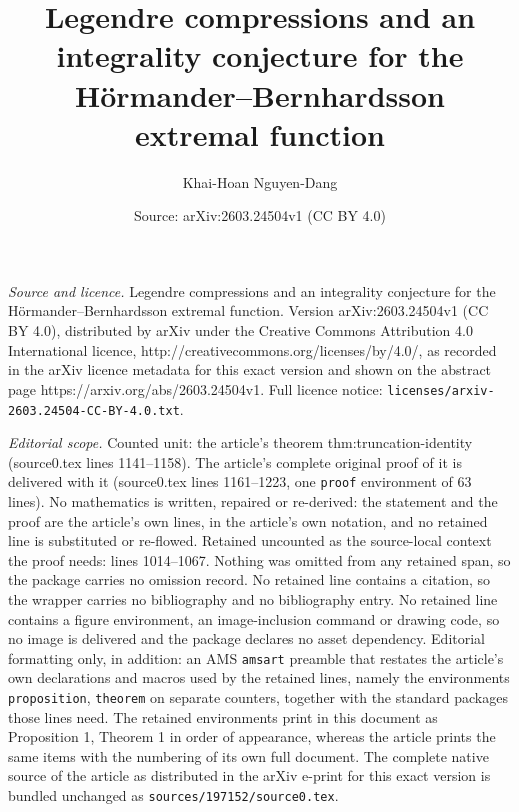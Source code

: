 \documentclass[10pt,a4paper]{amsart}
\title{Legendre compressions and an integrality conjecture for the H\"ormander--Bernhardsson extremal function}
\author{Khai-Hoan Nguyen-Dang}
\date{Source: arXiv:2603.24504v1 (CC BY 4.0)}
\begin{document}
\maketitle

\noindent\emph{Source and licence.} Legendre compressions and an integrality conjecture for the H\"ormander--Bernhardsson extremal function. Version arXiv:2603.24504v1 (CC BY 4.0), distributed by arXiv under the Creative Commons Attribution 4.0 International licence, http://creativecommons.org/licenses/by/4.0/, as recorded in the arXiv licence metadata for this exact version and shown on the abstract page https://arxiv.org/abs/2603.24504v1. Full licence notice: \texttt{licenses/arxiv-2603.24504-CC-BY-4.0.txt}.\par\smallskip

\noindent\textit{Editorial scope.} Counted unit: the article's theorem thm:truncation-identity (source0.tex lines 1141--1158). The article's complete original proof of it is delivered with it (source0.tex lines 1161--1223, one \texttt{proof} environment of 63 lines). No mathematics is written, repaired or re-derived: the statement and the proof are the article's own lines, in the article's own notation, and no retained line is substituted or re-flowed.  Retained uncounted as the source-local context the proof needs: lines 1014--1067.  Nothing was omitted from any retained span, so the package carries no omission record.  No retained line contains a citation, so the wrapper carries no bibliography and no bibliography entry.  No retained line contains a figure environment, an image-inclusion command or drawing code, so no image is delivered and the package declares no asset dependency.  Editorial formatting only, in addition: an AMS \texttt{amsart} preamble that restates the article's own declarations and macros used by the retained lines, namely the environments \texttt{proposition}, \texttt{theorem} on separate counters, together with the standard packages those lines need.  The retained environments print in this document as Proposition 1, Theorem 1 in order of appearance, whereas the article prints the same items with the numbering of its own full document.  The complete native source of the article as distributed in the arXiv e-print for this exact version is bundled unchanged as \texttt{sources/197152/source0.tex}.
\end{document}
